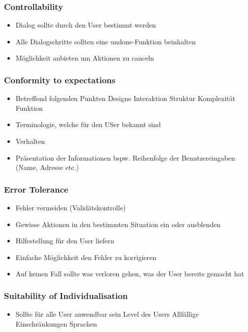 \documentclass{report}
\theoremstyle{definition}
\theoremstyle{example}
\begin{document}
\subsubsection{Controllability}
\begin{itemize}
   \item Dialog sollte durch den User bestimmt werden
   \item Alle Dialogschritte sollten eine undone-Funktion beinhalten
   \item Möglichkeit anbieten um Aktionen zu canceln
\end{itemize}

\subsubsection{Conformity to expectations}
\begin{itemize}
   \item Betreffend folgenden Punkten
   \subitem Designe
   \subitem Interaktion
   \subitem Struktur
   \subitem Komplexität
   \subitem Funktion
   \item Terminologie, welche für den USer bekannt sind
   \item Verhalten 
   \item Präsentation der Informationen 
   \subitem bspw. Reihenfolge der Benutzereingaben (Name, Adresse etc.) 
\end{itemize}

\subsubsection{Error Tolerance}
\begin{itemize}
   \item Fehler vermeiden (Validätskontrolle)
   \item Gewisse Aktionen in den bestimmten Situation ein oder ausblenden
   \item Hilfestellung für den User liefern
   \item Einfache Möglichkeit den Fehler zu korrigieren
   \item Auf keinen Fall sollte was verloren gehen, was der User bereits gemacht hat
\end{itemize}

\subsubsection{Suitability of Individualisation}
\begin{itemize}
   \item Sollte für alle User anwendbar sein
   \subitem Level des Users
   \subitem Allfällige Einschränkungen
   \subitem Sprachen 
\end{itemize}
\end{document}
